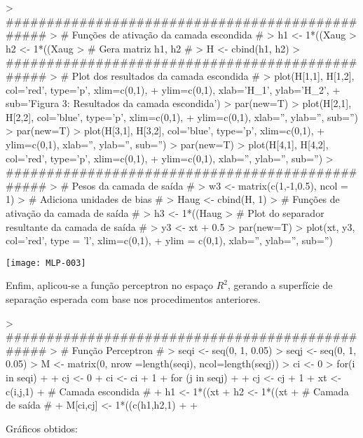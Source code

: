 \documentclass{article}
\begin{document}
\begin{Schunk}
\begin{Sinput}
> ################################################
> # Funções de ativação da camada escondida #
> h1 <- 1*((Xaug %*% w1) >= 0)
> h2 <- 1*((Xaug %*% w2) >= 0)
> # Gera matriz h1, h2 #
> H <- cbind(h1, h2)
> ################################################
> # Plot dos resultados da camada escondida #
> plot(H[1,1], H[1,2], col='red', type='p', xlim=c(0,1), 
+      ylim=c(0,1), xlab='H_1', ylab='H_2',
+      sub='Figura 3: Resultados da camada escondida')
> par(new=T)
> plot(H[2,1], H[2,2], col='blue', type='p', xlim=c(0,1),
+      ylim=c(0,1), xlab='', ylab='', sub='')
> par(new=T)
> plot(H[3,1], H[3,2], col='blue', type='p', xlim=c(0,1),
+      ylim=c(0,1), xlab='', ylab='', sub='')
> par(new=T)
> plot(H[4,1], H[4,2], col='red', type='p', xlim=c(0,1),
+      ylim=c(0,1), xlab='', ylab='', sub='')
> ################################################
> # Pesos da camada de saída #
> w3 <- matrix(c(1,-1,0.5), ncol = 1)
> # Adiciona unidades de bias #
> Haug <- cbind(H, 1)
> # Funções de ativação da camada de saída #
> h3 <- 1*((Haug %*% w3) <= 0)
> # Plot do separador resultante da camada de saída #
> y3 <- xt + 0.5
> par(new=T)
> plot(xt, y3, col='red', type = 'l', xlim=c(0,1), 
+      ylim = c(0,1), xlab='', ylab='', sub='')
\end{Sinput}
\end{Schunk}
\texttt{[image: MLP-003]}

Enfim, aplicou-se a função perceptron no espaço $R^2$, gerando a superfície de separação esperada com base nos procedimentos anteriores.

\begin{Schunk}
\begin{Sinput}
> ################################################
> # Função Perceptron #
> seqi <- seq(0, 1, 0.05)
> seqj <- seq(0, 1, 0.05)
> M <- matrix(0, nrow =length(seqi), ncol=length(seqj))
> ci <- 0
> for(i in seqi)
+ {
+   cj <- 0
+   ci <- ci + 1
+   for (j in seqj)
+   {
+     cj <- cj + 1
+     xt <- c(i,j,1)
+     # Camada escondida #
+     h1 <- 1*((xt %*% w1) >= 0)
+     h2 <- 1*((xt %*% w2) >= 0)
+     # Camada de saída #
+     M[ci,cj] <- 1*((c(h1,h2,1) %*% w3) <= 0)
+   }
+ }
\end{Sinput}
\end{Schunk}

Gráficos obtidos:
\end{document}
